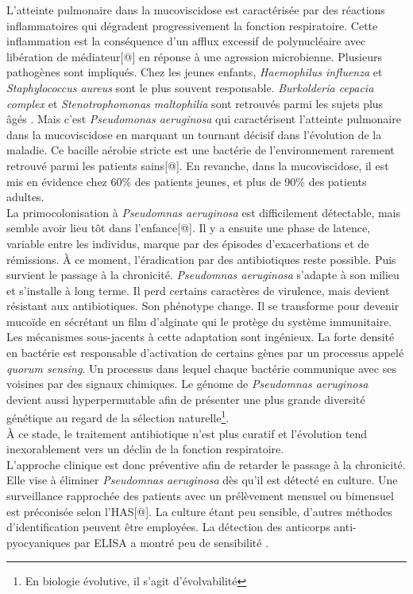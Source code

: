\documentclass[12pt,a4paper]{article}
\begin{document}
L’atteinte pulmonaire dans la mucoviscidose est caractérisée par des réactions inflammatoires qui dégradent progressivement la fonction respiratoire. Cette inflammation est la conséquence d'un afflux excessif de polynucléaire avec libération de médiateur[@] en réponse à une agression microbienne. Plusieurs pathogènes sont impliqués. Chez les jeunes enfants\cite{Davies}, \textit{Haemophilus influenza} et \textit{Staphylococcus aureus} sont le plus souvent responsable. \textit{Burkolderia cepacia complex} et \textit{Stenotrophomonas maltophilia} sont retrouvés parmi les sujets plus âgés \cite{Davies}.
Mais c’est \textit{Pseudomonas aeruginosa} qui caractérisent l’atteinte pulmonaire dans la mucoviscidose en marquant un tournant décisif dans l’évolution de la maladie. Ce bacille aérobie stricte est une bactérie de l'environnement rarement retrouvé parmi les patients sains[@]. En revanche, dans la mucoviscidose, il est mis en évidence chez 60\%\cite{LeBourgeois} des patients jeunes, et plus de 90\% des patients adultes\cite{LeBourgeois}.\\
La primocolonisation à \textit{Pseudomnas aeruginosa} est difficilement détectable, mais semble avoir lieu tôt dans l’enfance[@]. Il y a ensuite une phase de latence, variable entre les individus, marque par des épisodes d’exacerbations et de rémissions. À ce moment, l’éradication par des antibiotiques reste possible.
Puis survient le passage à la chronicité. \textit{Pseudomnas aeruginosa} s'adapte à son milieu et s’installe à long terme. Il perd certains caractères de virulence, mais devient résistant aux antibiotiques\cite{LeBourgeois}. Son phénotype change. Il se transforme pour devenir mucoïde en sécrétant un film d’alginate qui le protège du système immunitaire. Les mécanismes sous-jacents à cette adaptation sont ingénieux. La forte densité en bactérie est responsable d’activation de certains gènes par un processus appelé \textit{quorum sensing}\cite{Ruimy2004}. Un processus dans lequel chaque bactérie communique avec ses voisines par des signaux chimiques.
Le génome de \textit{Pseudomnas aeruginosa} devient aussi hyperpermutable\cite{Davies} afin de présenter une plus grande diversité génétique au regard de la sélection naturelle\footnote{En biologie évolutive, il s'agit d'évolvabilité}. \\
À ce stade, le traitement antibiotique n’est plus curatif et l'évolution tend inexorablement vers un déclin de la fonction respiratoire. \\
L'approche clinique est donc préventive afin de retarder le passage à la chronicité. Elle vise à éliminer \textit{Pseudomnas aeruginosa} dès qu'il est détecté en culture. Une surveillance rapprochée des patients avec un prélèvement mensuel ou bimensuel est préconisée selon l'HAS[@]. La culture étant peu sensible, d’autres méthodes d'identification peuvent être employées. La détection des anticorps anti-pyocyaniques par ELISA a montré peu de sensibilité \cite{Plesiat}.
\end{document}
